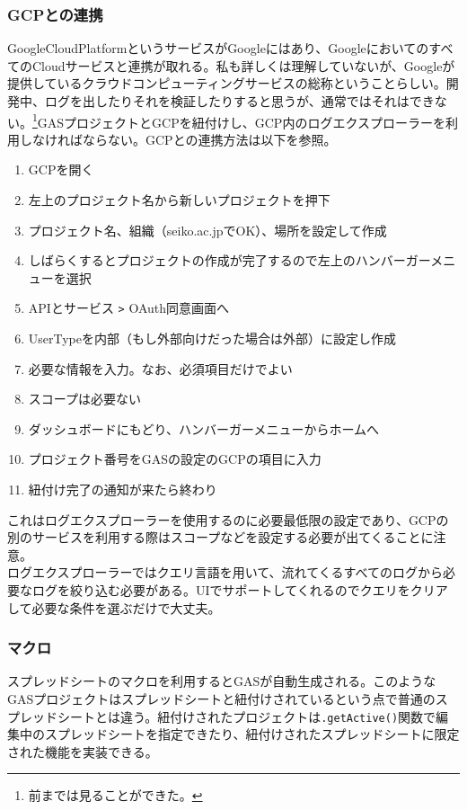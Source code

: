 \documentclass[dvipdfmx,jb5]{jreport}
\newcommand{\terlogy}[2][|]{\colorbox{terlogy}{\texttt{\lstinline#1#2#1}}}
\begin{document}
\subsubsection{GCPとの連携}
GoogleCloudPlatformというサービスがGoogleにはあり、GoogleにおいてのすべてのCloudサービスと連携が取れる。私も詳しくは理解していないが、Googleが提供しているクラウドコンピューティングサービスの総称ということらしい。開発中、ログを出したりそれを検証したりすると思うが、通常ではそれはできない。\footnote{前までは見ることができた。}GASプロジェクトとGCPを紐付けし、GCP内のログエクスプローラーを利用しなければならない。GCPとの連携方法は以下を参照。
\begin{enumerate}
      \item GCPを開く
      \item 左上のプロジェクト名から新しいプロジェクトを押下
      \item プロジェクト名、組織（seiko.ac.jpでOK）、場所を設定して作成
      \item しばらくするとプロジェクトの作成が完了するので左上のハンバーガーメニューを選択
      \item APIとサービス \verb|>| OAuth同意画面へ
      \item UserTypeを内部（もし外部向けだった場合は外部）に設定し作成
      \item 必要な情報を入力。なお、必須項目だけでよい
      \item スコープは必要ない
      \item ダッシュボードにもどり、ハンバーガーメニューからホームへ
      \item プロジェクト番号をGASの設定のGCPの項目に入力
      \item 紐付け完了の通知が来たら終わり
\end{enumerate}
これはログエクスプローラーを使用するのに必要最低限の設定であり、GCPの別のサービスを利用する際はスコープなどを設定する必要が出てくることに注意。
\\

ログエクスプローラーではクエリ言語を用いて、流れてくるすべてのログから必要なログを絞り込む必要がある。UIでサポートしてくれるのでクエリをクリアして必要な条件を選ぶだけで大丈夫。
\subsubsection{マクロ}
スプレッドシートのマクロを利用するとGASが自動生成される。このようなGASプロジェクトはスプレッドシートと紐付けされているという点で普通のスプレッドシートとは違う。紐付けされたプロジェクトは\terlogy{.getActive()}関数で編集中のスプレッドシートを指定できたり、紐付けされたスプレッドシートに限定された機能を実装できる。
\\
\end{document}
